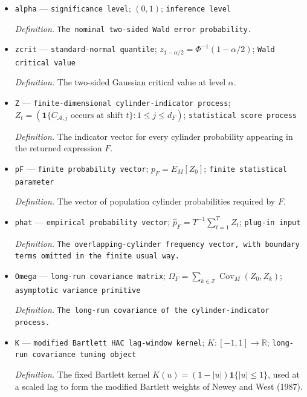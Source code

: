 \documentclass{article}
\begin{document}
\begin{itemize}
  \par\smallskip\noindent\emph{Definition.} \texttt{The geometric absolute-\allowbreak{}regularity ratio.}
  \item \texttt{alpha} --- \texttt{significance level}; \((0,1)\); \texttt{inference level}
  \par\smallskip\noindent\emph{Definition.} \texttt{The nominal two-\allowbreak{}sided Wald error probability.}
  \item \texttt{zcrit} --- \texttt{standard-\allowbreak{}normal quantile}; \(z_{1-\alpha/2}=\Phi^{-1}(1-\alpha/2)\); \texttt{Wald critical value}
  \par\smallskip\noindent\emph{Definition.} The two-sided Gaussian critical value at level \(\alpha\).
  \item \texttt{Z} --- \texttt{finite-\allowbreak{}dimensional cylinder-\allowbreak{}indicator process}; \(Z_t=(\mathbf 1\{C_{\mathcal A,j}\text{ occurs at shift }t\}:1\le j\le d_F)\); \texttt{statistical score process}
  \par\smallskip\noindent\emph{Definition.} The indicator vector for every cylinder probability appearing in the returned expression \(F\).
  \item \texttt{pF} --- \texttt{finite probability vector}; \(p_F=E_M[Z_0]\); \texttt{finite statistical parameter}
  \par\smallskip\noindent\emph{Definition.} The vector of population cylinder probabilities required by \(F\).
  \item \texttt{phat} --- \texttt{empirical probability vector}; \(\widehat p_F=T^{-1}\sum_{t=1}^{T}Z_t\); \texttt{plug-\allowbreak{}in input}
  \par\smallskip\noindent\emph{Definition.} \texttt{The overlapping-\allowbreak{}cylinder frequency vector,\allowbreak{} with boundary terms omitted in the finite usual way.}
  \item \texttt{Omega} --- \texttt{long-\allowbreak{}run covariance matrix}; \(\Omega_F=\sum_{k\in\mathbb Z}\operatorname{Cov}_M(Z_0,Z_k)\); \texttt{asymptotic variance primitive}
  \par\smallskip\noindent\emph{Definition.} \texttt{The long-\allowbreak{}run covariance of the cylinder-\allowbreak{}indicator process.}
  \item \texttt{K} --- \texttt{modified Bartlett HAC lag-\allowbreak{}window kernel}; \(K:[-1,1]\to\mathbb R\); \texttt{long-\allowbreak{}run covariance tuning object}
  \par\smallskip\noindent\emph{Definition.} The fixed Bartlett kernel \(K(u)=(1-|u|)\mathbf 1\{|u|\le1\}\), used at a scaled lag to form the modified Bartlett weights of Newey and West (1987).

\end{itemize}
\end{document}
